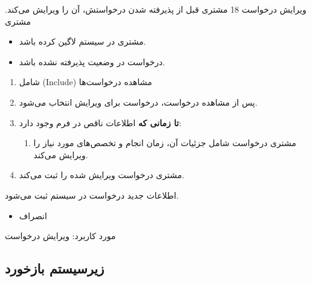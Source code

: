 {
	\usecase
	{ویرایش درخواست}
	{18}
	{مشتری قبل از پذیرفته شدن درخواستش، آن را ویرایش می‌کند.}
	{مشتری}
	{}
	{
		
		\begin{itemize}
			\item
			مشتری در سیستم لاگین کرده باشد.
			
			\item 
			درخواست در وضعیت پذیرفته نشده باشد.
			
		\end{itemize}	
		
		
	}
	{
		\vspace*{-0.6cm}
		\begin{enumerate}
			\item
				شامل (Include) مشاهده  درخواست‌ها
				
				\item
				پس از مشاهده درخواست، درخواست برای ویرایش انتخاب می‌شود.
				
				\item 
				\textbf{تا زمانی که}
				اطلاعات ناقص در فرم وجود دارد:
				\begin{enumerate}[label=\theenumi.\arabic*.]
					\item 
	مشتری درخواست شامل جزئیات آن، زمان انجام و تخصص‌های مورد نیاز را ویرایش می‌کند.
				\end{enumerate}
				\item 
			مشتری درخواست ویرایش شده را ثبت می‌کند.
				
			
		\end{enumerate}
	}
	{اطلاعات جدید درخواست در سیستم ثبت می‌شود.}
	{
		\begin{itemize}
			\vspace*{-0.6cm}
			\item انصراف
		\end{itemize}
	}
	{
		مورد کاربرد: ویرایش درخواست
	}
	
}



\newpage

\subsection{زیرسیستم بازخورد}

